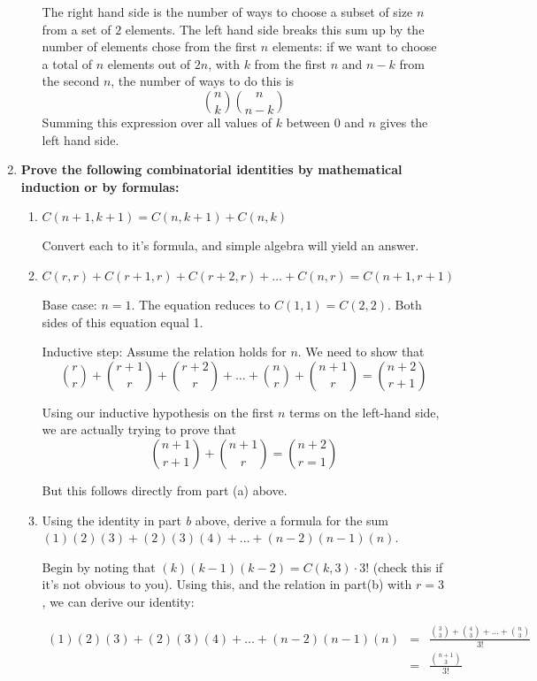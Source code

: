 \documentclass[12pt]{amsart}
\begin{document}
\begin{enumerate}
\begin{enumerate}
The right hand side is the number of ways to choose a subset of size
$n$ from a set of $2$ elements.  The left hand side breaks this sum up
by the number of elements chose from the first $n$ elements: if we
want to choose a total of $n$ elements out of $2n$, with $k$ from the
first $n$ and $n-k$ from the second $n$, the number of ways to do this
is
$$
{n \choose k}{n \choose n-k}
$$
Summing this expression over all values of $k$ between 0 and $n$ gives
the left hand side.

\end {enumerate}


\medskip

\item {\bf Prove the following combinatorial identities by mathematical induction or by formulas:}
\begin{enumerate}
\item {\bf $C(n+1,k+1) = C(n,k+1)+C(n,k)$}

Convert each to it's formula, and simple algebra will yield an
answer.

\item {\bf $C(r,r)+C(r+1,r)+C(r+2,r)+\ldots+C(n,r) = C(n+1,r+1)$}

Base case: $n=1$.  The equation reduces to $C(1,1) = C(2,2)$.  Both
sides of this equation equal 1.

Inductive step: Assume the relation holds for $n$.  We need to show that
$$
{r \choose r} + {r+1 \choose r} + {r+2 \choose r} + \ldots + {n \choose r} + {n+1 \choose r} = {n+2 \choose r+1}
$$

Using our inductive hypothesis on the first $n$ terms on the left-hand
side, we are actually trying to prove that
$$
{n+1 \choose r+1} + {n+1 \choose r} = {n+2 \choose r=1}
$$

But this follows directly from part (a) above.

\item Using the identity in part {\em b} above, derive a formula for the sum $(1)(2)(3) + (2)(3)(4) + \ldots + (n-2)(n-1)(n)$.

Begin by noting that $(k)(k-1)(k-2) = C(k,3)\cdot 3!$ (check this if
it's not obvious to you).  Using this, and the relation in part(b)
with $r=3$, we can derive our identity:

\begin{eqnarray*}
(1)(2)(3) + (2)(3)(4) + \ldots +(n-2)(n-1)(n) & = & \frac{{3 \choose 3} + {4 \choose 3} + \ldots + {n \choose 3}}{3!} \\
& = & \frac{{n+1 \choose 3}}{3!}
\end{eqnarray*}


\end{enumerate}
\end{enumerate}
\end{document}
